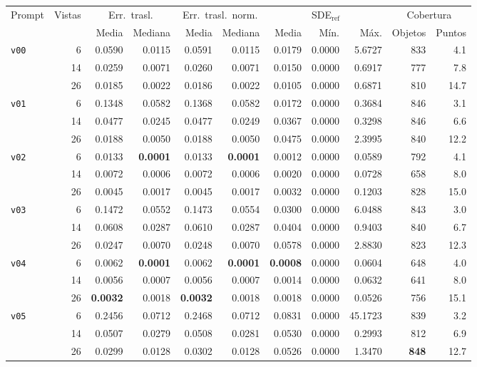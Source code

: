 \begin{table}[H]
\vspace{2ex}

\begin{tabular*}{\textwidth}{@{\extracolsep{\fill}}lrrrrrrrrrr@{}}
\toprule
\multirow{2}{*}{Prompt} & \multirow{2}{*}{Vistas} & \multicolumn{2}{c}{Err.\ trasl.} & \multicolumn{2}{c}{Err.\ trasl.\ norm.} & \multicolumn{3}{c}{SDE$_{\mathrm{ref}}$} & \multicolumn{2}{c}{Cobertura} \\
\cmidrule(lr){3-4} \cmidrule(lr){5-6} \cmidrule(lr){7-9} \cmidrule(lr){10-11}
 &  & Media & Mediana & Media & Mediana & Media & Mín. & Máx. & Objetos & Puntos \\
\midrule
\multirow{3}{*}{\texttt{v00}} & 6 & 0.0590 & 0.0115 & 0.0591 & 0.0115 & 0.0179 & 0.0000 & 5.6727 & 833 & 4.1 \\
 & 14 & 0.0259 & 0.0071 & 0.0260 & 0.0071 & 0.0150 & 0.0000 & 0.6917 & 777 & 7.8 \\
 & 26 & 0.0185 & 0.0022 & 0.0186 & 0.0022 & 0.0105 & 0.0000 & 0.6871 & 810 & 14.7 \\
\midrule
\multirow{3}{*}{\texttt{v01}} & 6 & 0.1348 & 0.0582 & 0.1368 & 0.0582 & 0.0172 & 0.0000 & 0.3684 & 846 & 3.1 \\
 & 14 & 0.0477 & 0.0245 & 0.0477 & 0.0249 & 0.0367 & 0.0000 & 0.3298 & 846 & 6.6 \\
 & 26 & 0.0188 & 0.0050 & 0.0188 & 0.0050 & 0.0475 & 0.0000 & 2.3995 & 840 & 12.2 \\
\midrule
\multirow{3}{*}{\texttt{v02}} & 6 & 0.0133 & \textbf{0.0001} & 0.0133 & \textbf{0.0001} & 0.0012 & 0.0000 & 0.0589 & 792 & 4.1 \\
 & 14 & 0.0072 & 0.0006 & 0.0072 & 0.0006 & 0.0020 & 0.0000 & 0.0728 & 658 & 8.0 \\
 & 26 & 0.0045 & 0.0017 & 0.0045 & 0.0017 & 0.0032 & 0.0000 & 0.1203 & 828 & 15.0 \\
\midrule
\multirow{3}{*}{\texttt{v03}} & 6 & 0.1472 & 0.0552 & 0.1473 & 0.0554 & 0.0300 & 0.0000 & 6.0488 & 843 & 3.0 \\
 & 14 & 0.0608 & 0.0287 & 0.0610 & 0.0287 & 0.0404 & 0.0000 & 0.9403 & 840 & 6.7 \\
 & 26 & 0.0247 & 0.0070 & 0.0248 & 0.0070 & 0.0578 & 0.0000 & 2.8830 & 823 & 12.3 \\
\midrule
\multirow{3}{*}{\texttt{v04}} & 6 & 0.0062 & \textbf{0.0001} & 0.0062 & \textbf{0.0001} & \textbf{0.0008} & 0.0000 & 0.0604 & 648 & 4.0 \\
 & 14 & 0.0056 & 0.0007 & 0.0056 & 0.0007 & 0.0014 & 0.0000 & 0.0632 & 641 & 8.0 \\
 & 26 & \textbf{0.0032} & 0.0018 & \textbf{0.0032} & 0.0018 & 0.0018 & 0.0000 & 0.0526 & 756 & 15.1 \\
\midrule
\multirow{3}{*}{\texttt{v05}} & 6 & 0.2456 & 0.0712 & 0.2468 & 0.0712 & 0.0831 & 0.0000 & 45.1723 & 839 & 3.2 \\
 & 14 & 0.0507 & 0.0279 & 0.0508 & 0.0281 & 0.0530 & 0.0000 & 0.2993 & 812 & 6.9 \\
 & 26 & 0.0299 & 0.0128 & 0.0302 & 0.0128 & 0.0526 & 0.0000 & 1.3470 & \textbf{848} & 12.7 \\
\bottomrule
\end{tabular*}


\end{table}
